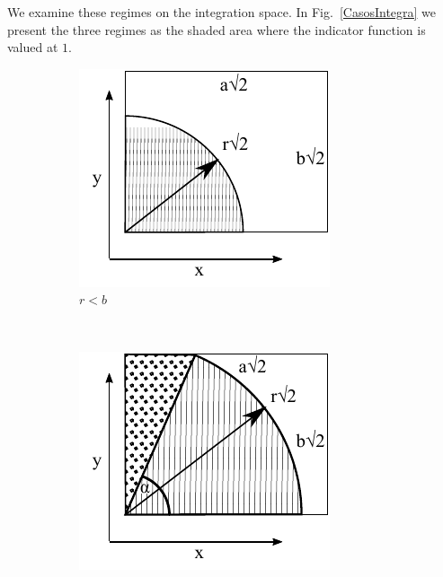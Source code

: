 \documentclass[superscriptaddress,pre,reprint,showpacs,twocolumn]{revtex4-1}
\begin{document}
We examine these regimes on the integration space.
In Fig.~\ref{CasosIntegra} we present the three regimes as
the shaded area where the indicator function is valued at $1$.

\begin{figure}[h]
        \centering
        \begin{subfigure}[b]{0.32\textwidth}
          \centering
          \includegraphics[width=\textwidth]{figures/DiagramaIntegraCaso1.pdf}
          \caption{$r<b$}
          \label{Caso1}
        \end{subfigure}%
        ~ %
        \begin{subfigure}[b]{0.32\textwidth}
          \centering
          \includegraphics[width=\textwidth]{figures/DiagramaIntegraCaso2.pdf}

\end{subfigure}
\end{figure}
\end{document}
